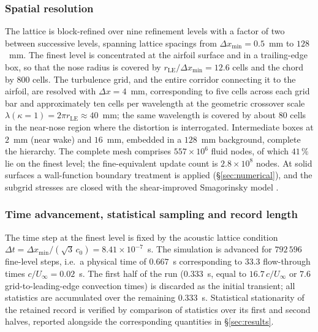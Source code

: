 \documentclass[lineno]{JFM-FLM_Au}
\begin{document}
\subsubsection{Spatial resolution}

The lattice is block-refined over nine refinement levels with a
factor of two between successive levels, spanning lattice spacings
from $\Delta x_{\min} = 0.5$~mm to $128$~mm. The finest level is
concentrated at the airfoil surface and in a trailing-edge box, so
that the nose radius is covered by
$r_{\mathrm{LE}}/\Delta x_{\min} = 12.6$ cells and the chord by $800$
cells. The turbulence grid, and the entire corridor connecting it to
the airfoil, are resolved with $\Delta x = 4$~mm, corresponding to
five cells across each grid bar and approximately ten cells per
wavelength at the geometric crossover scale
$\lambda(\kappa{=}1) = 2\pi r_{\mathrm{LE}} \approx 40$~mm; the same
wavelength is covered by about $80$ cells in the near-nose region
where the distortion is interrogated. Intermediate boxes at $2$~mm
(near wake) and $16$~mm, embedded in a $128$~mm background, complete
the hierarchy. The complete mesh comprises $557\times10^{6}$ fluid
nodes, of which $41\,\%$ lie on the finest level; the fine-equivalent
update count is $2.8\times10^{8}$ nodes. At solid surfaces a
wall-function boundary treatment is applied
(\S\ref{sec:numerical}), and the subgrid stresses are closed with the
shear-improved Smagorinsky model \citep{Leveque2007}.

\subsubsection{Time advancement, statistical sampling and record
length}

The time step at the finest level is fixed by the acoustic lattice
condition $\Delta t = \Delta x_{\min}/(\sqrt{3}\,c_0)
= 8.41\times10^{-7}$~s. The simulation is advanced for
$792\,596$ fine-level steps, i.e.\ a physical time of $0.667$~s
corresponding to $33.3$ flow-through times $c/U_{\infty} = 0.02$~s.
The first half of the run ($0.333$~s, equal to $16.7\,c/U_{\infty}$
or $7.6$ grid-to-leading-edge convection times) is discarded as the
initial transient; all statistics are accumulated over the remaining
$0.333$~s. Statistical stationarity of the retained record is
verified by comparison of statistics over its first and second
halves, reported alongside the corresponding quantities in
\S\ref{sec:results}.
\end{document}
